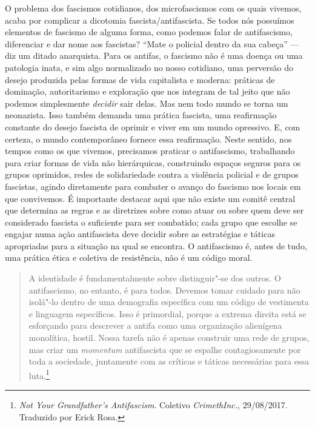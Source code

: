 O problema dos fascismos cotidianos, dos microfascismos com os quais
vivemos, acaba por complicar a dicotomia fascista/antifascista. Se todos
nós possuímos elementos de fascismo de alguma forma, como podemos falar
de antifascismo, diferenciar e dar nome aos fascistas?
``Mate o policial dentro da sua cabeça'' --- diz um ditado anarquista. Para
os antifas, o fascismo não é uma doença ou uma patologia inata, e sim
algo normalizado no nosso cotidiano, uma perversão
do desejo produzida pelas formas de vida capitalista e
moderna: práticas de dominação, autoritarismo e exploração que nos
integram de tal jeito que não podemos simplesmente \emph{decidir} sair
delas. Mas nem todo mundo se torna um neonazista. Isso também demanda
uma prática fascista, uma reafirmação constante do desejo fascista de
oprimir e viver em um mundo opressivo. E, com certeza, o mundo contemporâneo fornece essa reafirmação. Neste sentido, nos tempos como os
que vivemos, precisamos praticar o antifascismo, trabalhando para criar
formas de vida não hierárquicas, construindo espaços seguros para os
grupos oprimidos, redes de solidariedade contra a violência policial e
de grupos fascistas, agindo diretamente para combater o avanço do
fascismo nos locais em que convivemos. É importante destacar aqui que não
existe um comitê central que determina as regras e as diretrizes sobre
como atuar ou sobre quem deve ser considerado fascista o suficiente para
ser combatido; cada grupo que escolhe se engajar numa ação antifascista
deve decidir sobre as estratégias e táticas apropriadas para a situação
na qual se encontra. O antifascismo é, antes de tudo, uma prática ética
e coletiva de resistência, não é um código moral.

\begin{quote}
A identidade é fundamentalmente sobre distinguir"-se dos outros. O
antifascismo, no entanto, é para todos. Devemos tomar cuidado para não
isolá"-lo dentro de uma demografia específica com um código de vestimenta
e linguagem específicos. Isso é primordial, porque a extrema direita
está se esforçando para descrever a antifa como uma organização
alienígena monolítica, hostil. Nossa tarefa não é apenas construir uma
rede de grupos, mas criar um \emph{momentum} antifascista que se espalhe
contagiosamente por toda a sociedade, juntamente com as críticas e
táticas necessárias para essa luta.\footnote{\emph{Not
  Your Grandfather's Antifascism}. Coletivo \emph{CrimethInc.}, 29/08/2017. Traduzido por Erick Rosa.}
\end{quote}

